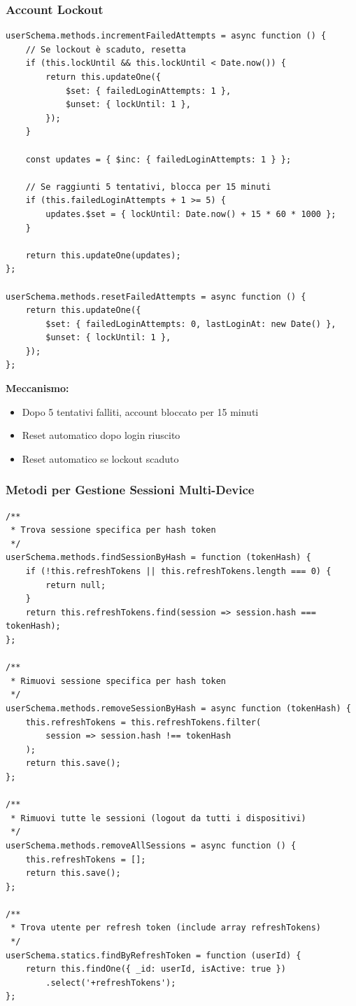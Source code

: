 \documentclass[11pt,a4paper]{article}
\begin{document}
\subsubsection{Account Lockout}

\begin{lstlisting}[caption=Metodi per Gestione Lockout]
userSchema.methods.incrementFailedAttempts = async function () {
    // Se lockout è scaduto, resetta
    if (this.lockUntil && this.lockUntil < Date.now()) {
        return this.updateOne({
            $set: { failedLoginAttempts: 1 },
            $unset: { lockUntil: 1 },
        });
    }

    const updates = { $inc: { failedLoginAttempts: 1 } };

    // Se raggiunti 5 tentativi, blocca per 15 minuti
    if (this.failedLoginAttempts + 1 >= 5) {
        updates.$set = { lockUntil: Date.now() + 15 * 60 * 1000 };
    }

    return this.updateOne(updates);
};

userSchema.methods.resetFailedAttempts = async function () {
    return this.updateOne({
        $set: { failedLoginAttempts: 0, lastLoginAt: new Date() },
        $unset: { lockUntil: 1 },
    });
};
\end{lstlisting}

\textbf{Meccanismo:}
\begin{itemize}
    \item Dopo 5 tentativi falliti, account bloccato per 15 minuti
    \item Reset automatico dopo login riuscito
    \item Reset automatico se lockout scaduto
\end{itemize}

\subsubsection{Metodi per Gestione Sessioni Multi-Device}

\begin{lstlisting}[caption=Metodi per Gestione Array Sessioni]
/**
 * Trova sessione specifica per hash token
 */
userSchema.methods.findSessionByHash = function (tokenHash) {
    if (!this.refreshTokens || this.refreshTokens.length === 0) {
        return null;
    }
    return this.refreshTokens.find(session => session.hash === tokenHash);
};

/**
 * Rimuovi sessione specifica per hash token
 */
userSchema.methods.removeSessionByHash = async function (tokenHash) {
    this.refreshTokens = this.refreshTokens.filter(
        session => session.hash !== tokenHash
    );
    return this.save();
};

/**
 * Rimuovi tutte le sessioni (logout da tutti i dispositivi)
 */
userSchema.methods.removeAllSessions = async function () {
    this.refreshTokens = [];
    return this.save();
};

/**
 * Trova utente per refresh token (include array refreshTokens)
 */
userSchema.statics.findByRefreshToken = function (userId) {
    return this.findOne({ _id: userId, isActive: true })
        .select('+refreshTokens');
};
\end{lstlisting}
\end{document}
